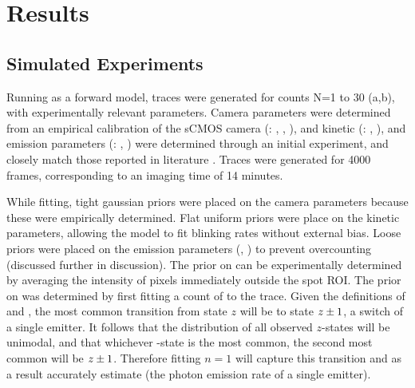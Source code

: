 \section{Results}






\subsection{Simulated Experiments}
Running \ours as a forward model, traces were generated for counts N=1 to 30
	(a,b), with experimentally relevant parameters. 
	Camera parameters were determined from an empirical calibration of the
	sCMOS camera (\parametersc: , , ), 
	and kinetic (\parameterst: , ), and emission parameters (\parameterse: , ) were determined through an
	initial experiment, and closely match those reported in literature \cite{stein_2021}.
	Traces were generated for 4000 frames, corresponding to an imaging time of 14 minutes.

While fitting, tight gaussian priors were placed on the camera parameters because these were empirically determined.
	Flat uniform priors were place on the kinetic parameters, allowing the model to fit blinking rates without external bias.
	Loose priors were placed on the emission parameters (\rb, \re) to prevent overcounting (discussed further in discussion). 
	The prior on \rb can be experimentally determined by averaging the intensity of pixels immediately outside the spot ROI.
	The prior on \re was determined by first fitting a count of  to the trace.
	Given the definitions of \pon and \poff, the most common transition from state $z$ will be to state $z_{} \pm 1$, a switch of a single emitter.
	It follows that the distribution of all observed $z$-states will be unimodal, and that whichever \z{}-state is the most common, 
	the second most common will be $z_{} \pm 1$. Therefore fitting $n=1$ will capture this transition 
	and as a result accurately estimate \re (the photon emission rate of a single emitter).
	

